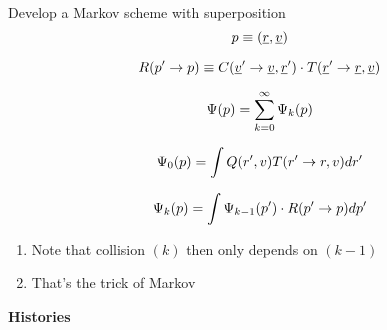 \documentclass[aspectratio=1610,pdftex,dvipsnames,compress,xcolor={dvipsnames}]{beamer}
\begin{document}
\begin{frame}{Develop a Markov scheme with superposition}
    \begin{equation}
        \Large
        p \equiv (\underline{r},\underline{v})
    \end{equation}

    \begin{equation}
        \Large
        R(p' \rightarrow p) \equiv C(\underline{v}' \rightarrow \underline{v},\underline{r}') \cdot T(\underline{r}' \rightarrow \underline{r},\underline{v})
    \end{equation}

    \begin{equation}
        \Large
        \Psi(p) = \sum_{k=0}^{\infty} \Psi_k(p)
    \end{equation}

    \begin{equation}
        \Large
        \Psi_0(p) = \int Q(r',v) T(r' \rightarrow r,v)dr'
    \end{equation}

    \begin{equation}
        \Large
        \Psi_k(p)=\int \Psi_{k-1}(p') \cdot R(p' \rightarrow p)dp'
    \end{equation}

    \vspace*{\fill}

    \begin{enumerate}[series=outerlist,topsep=0pt,itemsep=11pt,leftmargin=*,label=(\arabic*)]
        \item[]Note that collision $(k)$ then only depends on $(k-1)$
        \item[]That's the trick of Markov
    \end{enumerate}
\end{frame}


\begin{frame}[plain]{}
    \centering\LARGE\textbf{Histories}
\end{frame}
\end{document}
